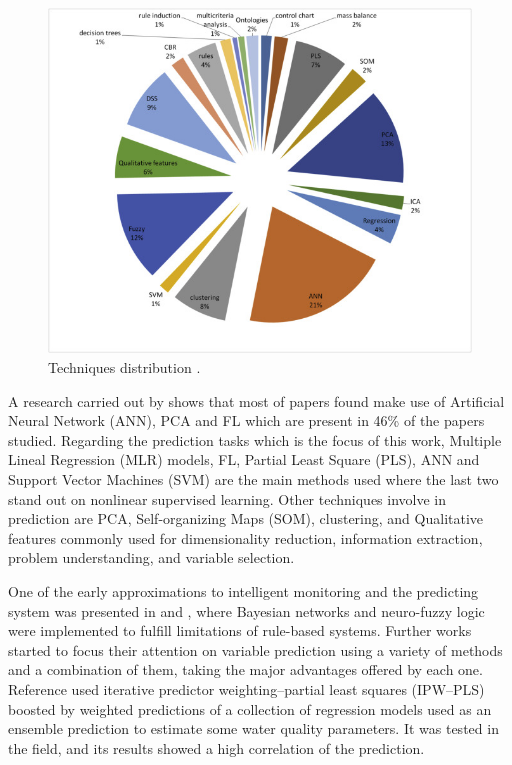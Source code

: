 \begin{figure}[t]
\centering
\includegraphics[width=15cm]{figures/3-Distribution-of-papers.jpg}
\caption{Techniques distribution \cite{Corominas2018}.}
\label{f:Techniques-Distribution}
\end{figure}

A research carried out by \cite{Corominas2018} shows that most of papers found make use of Artificial Neural Network (ANN), \ac{PCA} and \ac{FL} which are present in 46\% of the papers studied. Regarding the prediction tasks which is the focus of this work, Multiple Lineal Regression (MLR) models, FL, Partial Least Square (PLS), ANN and Support Vector Machines (SVM) are the main methods used where the last two stand out on nonlinear supervised learning. Other techniques involve in prediction are PCA, Self-organizing Maps (SOM), clustering, and Qualitative features commonly used for dimensionality reduction, information extraction, problem understanding, and variable selection.

One of the early approximations to intelligent monitoring and the predicting system was presented in \cite{Sanguesa2000} and \cite{Haggege2005}, where Bayesian networks and neuro-fuzzy logic were implemented to fulfill limitations of rule-based systems. Further works started to focus their attention on variable prediction using a variety of methods and a combination of them, taking the major advantages offered by each one. Reference \cite{Qin2012} used iterative predictor weighting–partial least squares (IPW–PLS) boosted by weighted predictions of a collection of regression models used as an ensemble prediction to estimate some water quality parameters. It was tested in the field, and its results showed a high correlation of the prediction. 

